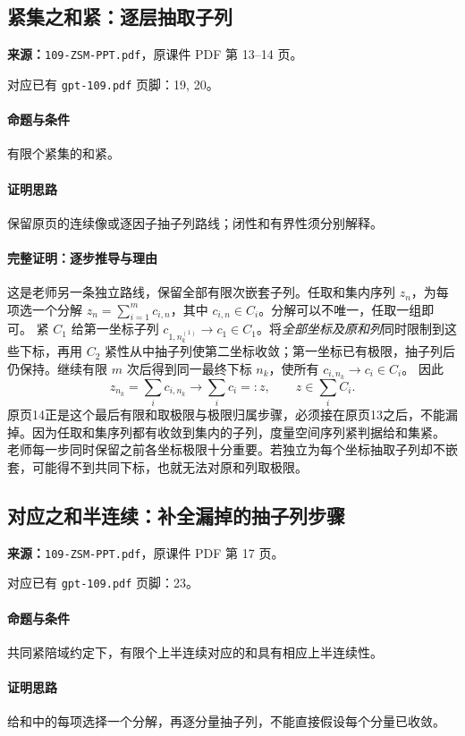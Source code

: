 \clearpage\subsection{紧集之和紧：逐层抽取子列}
\textbf{来源：}\texttt{109-ZSM-PPT.pdf}，原课件 PDF 第 13--14 页。\par
对应已有 \texttt{gpt-109.pdf} 页脚：19, 20。\par
\paragraph{命题与条件}有限个紧集的和紧。
\paragraph{证明思路}保留原页的连续像或逐因子抽子列路线；闭性和有界性须分别解释。
\paragraph{完整证明：逐步推导与理由}

这是老师另一条独立路线，保留全部有限次嵌套子列。任取和集内序列 $z_n$，为每项选一个分解 $z_n=\sum_{i=1}^m c_{i,n}$，其中 $c_{i,n}\in C_i$。分解可以不唯一，任取一组即可。
紧 $C_1$ 给第一坐标子列 $c_{1,n^{(1)}_k}\to c_1\in C_1$。将\emph{全部坐标及原和列}同时限制到这些下标，再用 $C_2$ 紧性从中抽子列使第二坐标收敛；第一坐标已有极限，抽子列后仍保持。继续有限 $m$ 次后得到同一最终下标 $n_k$，使所有 $c_{i,n_k}\to c_i\in C_i$。
因此
\[z_{n_k}=\sum_i c_{i,n_k}\longrightarrow\sum_i c_i=:z,\qquad z\in\sum_i C_i.\]
原页14正是这个最后有限和取极限与极限归属步骤，必须接在原页13之后，不能漏掉。因为任取和集序列都有收敛到集内的子列，度量空间序列紧判据给和集紧。
老师每一步同时保留之前各坐标极限十分重要。若独立为每个坐标抽取子列却不嵌套，可能得不到共同下标，也就无法对原和列取极限。

\clearpage\subsection{对应之和半连续：补全漏掉的抽子列步骤}
\textbf{来源：}\texttt{109-ZSM-PPT.pdf}，原课件 PDF 第 17 页。\par
对应已有 \texttt{gpt-109.pdf} 页脚：23。\par
\paragraph{命题与条件}共同紧陪域约定下，有限个上半连续对应的和具有相应上半连续性。
\paragraph{证明思路}给和中的每项选择一个分解，再逐分量抽子列，不能直接假设每个分量已收敛。
